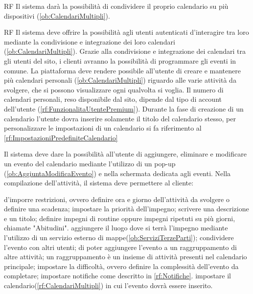 \begin{listaPersonale}{RF}
 Il sistema darà la possibilità di condividere il proprio calendario su più dispositivi (\ref{ob:CalendariMultipli}).

	\begin{listaPersonale2}{RF}
		 Il sistema deve offrire la possibilità agli utenti autenticati d'interagire tra loro mediante la condivisione e integrazione dei loro calendari (\ref{ob:CalendariMultipli}). Grazie alla condivisione e integrazione dei calendari tra gli utenti del sito, i clienti avranno la possibilità di programmare gli eventi in comune.
 La piattaforma deve rendere possibile all'utente di creare e mantenere più calendari personali (\ref{ob:CalendariMultipli}) riguardo alle varie attività da svolgere, che si possono visualizzare ogni qualvolta si voglia. Il numero di calendari personali, reso disponibile dal sito, dipende dal tipo di account dell'utente (\ref{rf:FunzionalitaUtentePremium}). Durante la fase di creazione di un calendario l'utente dovra inserire solamente il titolo del calendario stesso, per personalizzare le impostazioni di un calendario si fa riferimento al \ref{rf:ImpostazioniPredefiniteCalendario}
	\end{listaPersonale2}

	 Il sistema deve dare la possibilità all'utente di aggiungere, eliminare e modificare un evento del calendario mediante l'utilizzo di un pop-up (\ref{ob:AggiuntaModificaEvento}) e nella schermata dedicata agli eventi. Nella compilazione dell'attività, il sistema deve permettere al cliente:
	\begin{listaPersonale2}{}
 d'imporre restrizioni, ovvero definire ora e giorno dell'attività da svolgere o definire una scadenza;
		 impostare la priorità dell'impegno;
		 scrivere una descrizione e un titolo;
		 definire impegni di routine oppure impegni ripetuti su più giorni, chiamate "Abitudini".
 aggiungere il luogo dove si terrà l'impegno mediante l'utilizzo di un servizio esterno di mappe(\ref{ob:ServiziTerzeParti});
		 condividere l'evento con altri utenti;
 di poter aggiungere l'evento a un raggruppamento di altre attività; un raggruppamento è un insieme di attività presenti nel calendario principale;
		 impostare la difficoltà, ovvero definire la complessità dell'evento da completare;
		 impostare notifiche come descritto in \ref{rf:Notifiche}.
 impostare il calendario(\ref{rf:CalendariMultipli}) in cui l'evento dovrà essere inserito.
	\end{listaPersonale2}



\end{listaPersonale}
